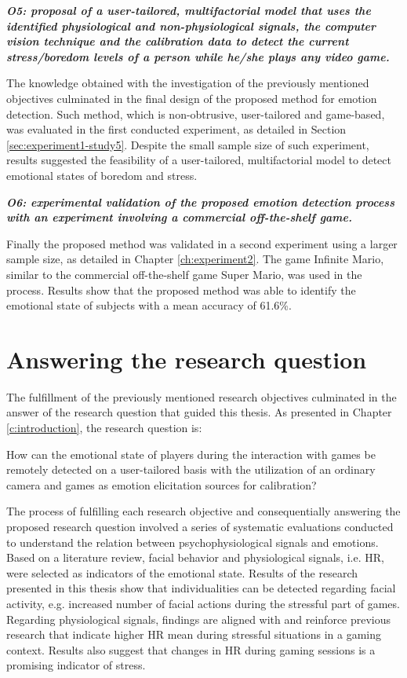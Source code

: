 \textit{\textbf{O5: proposal of a user-tailored, multifactorial model that uses the identified physiological and non-physiological signals, the computer vision technique and the calibration data to detect the current stress/boredom levels of a person while he/she plays any video game.}}

The knowledge obtained with the investigation of the previously mentioned objectives culminated in the final design of the proposed method for emotion detection. Such method, which is non-obtrusive, user-tailored and game-based, was evaluated in the first conducted experiment, as detailed in Section \ref{sec:experiment1-study5}. Despite the small sample size of such experiment, results suggested the feasibility of a user-tailored, multifactorial model to detect emotional states of boredom and stress.

\textit{\textbf{O6: experimental validation of the proposed emotion detection process with an experiment involving a commercial off-the-shelf game.}}

Finally the proposed method was validated in a second experiment using a larger sample size, as detailed in Chapter \ref{ch:experiment2}. The game Infinite Mario, similar to the commercial off-the-shelf game Super Mario, was used in the process. Results show that the proposed method was able to identify the emotional state of subjects with a mean accuracy of 61.6\%.

\section{Answering the research question}

The fulfillment of the previously mentioned research objectives culminated in the answer of the research question that guided this thesis. As presented in Chapter \ref{c:introduction}, the research question is:

\begin{fquote}
How can the emotional state of players during the interaction with games be remotely detected on a user-tailored basis with the utilization of an ordinary camera and games as emotion elicitation sources for calibration?
\end{fquote}

The process of fulfilling each research objective and consequentially answering the proposed research question involved a series of systematic evaluations conducted to understand the relation between psychophysiological signals and emotions. Based on a literature review, facial behavior and physiological signals, i.e. HR, were selected as indicators of the emotional state. Results of the research presented in this thesis show that individualities can be detected regarding facial activity, e.g. increased number of facial actions during the stressful part of games. Regarding physiological signals, findings are aligned with and reinforce previous research that indicate higher HR mean during stressful situations in a gaming context. Results also suggest that changes in HR during gaming sessions is a promising indicator of stress.

